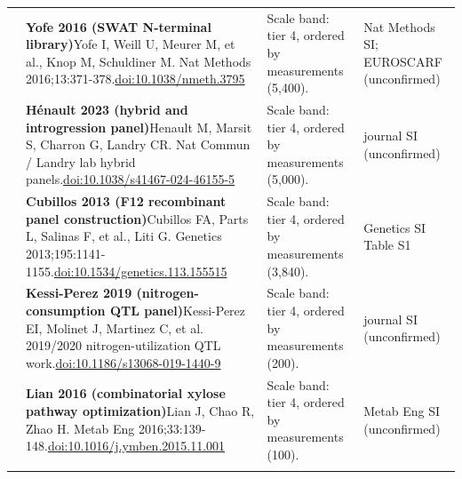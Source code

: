 \begin{landscape}
\begin{longtable}{@{}r@{\hspace{4pt}} L{86mm} L{92mm} L{62mm}@{}}
 & \textbf{Yofe 2016 (SWAT N-terminal library)}\newline Yofe I, Weill U, Meurer M, et al., Knop M, Schuldiner M. Nat Methods 2016;13:371-378.\newline \href{https://doi.org/10.1038/nmeth.3795}{doi:10.1038/\allowbreak nmeth.3795} & Scale band: tier 4, ordered by measurements (5,400). & Nat Methods SI; EUROSCARF (unconfirmed) \\
 & \textbf{Hénault 2023 (hybrid and introgression panel)}\newline Henault M, Marsit S, Charron G, Landry CR. Nat Commun / Landry lab hybrid panels.\newline \href{https://doi.org/10.1038/s41467-024-46155-5}{doi:10.1038/\allowbreak s41467-024-46155-5} & Scale band: tier 4, ordered by measurements (5,000). & journal SI (unconfirmed) \\
 & \textbf{Cubillos 2013 (F12 recombinant panel construction)}\newline Cubillos FA, Parts L, Salinas F, et al., Liti G. Genetics 2013;195:1141-1155.\newline \href{https://doi.org/10.1534/genetics.113.155515}{doi:10.1534/\allowbreak genetics.113.155515} & Scale band: tier 4, ordered by measurements (3,840). & Genetics SI Table S1 \\
 & \textbf{Kessi-Perez 2019 (nitrogen-consumption QTL panel)}\newline Kessi-Perez EI, Molinet J, Martinez C, et al. 2019/2020 nitrogen-utilization QTL work.\newline \href{https://doi.org/10.1186/s13068-019-1440-9}{doi:10.1186/\allowbreak s13068-019-1440-9} & Scale band: tier 4, ordered by measurements (200). & journal SI (unconfirmed) \\
 & \textbf{Lian 2016 (combinatorial xylose pathway optimization)}\newline Lian J, Chao R, Zhao H. Metab Eng 2016;33:139-148.\newline \href{https://doi.org/10.1016/j.ymben.2015.11.001}{doi:10.1016/\allowbreak j.ymben.2015.11.001} & Scale band: tier 4, ordered by measurements (100). & Metab Eng SI (unconfirmed) \\
\addlinespace[5pt]
\end{longtable}
\endgroup
\end{landscape}
